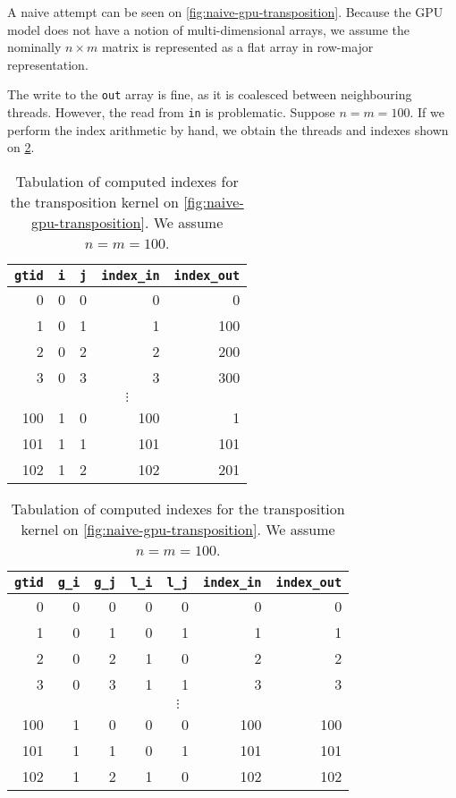 A naive attempt can be seen on \cref{fig:naive-gpu-transposition}.
Because the GPU model does not have a notion of multi-dimensional
arrays, we assume the nominally $n\times{}m$ matrix is represented as
a flat array in row-major representation.

The write to the \texttt{out} array is fine, as it is coalesced
between neighbouring threads.  However, the read from \texttt{in} is
problematic.  Suppose $n=m=100$.  If we perform the index arithmetic
by hand, we obtain the threads and indexes shown on
\cref{tab:naive-gpu-indices}.

\begin{table}

  \begin{subtable}{\textwidth}
  \centering
\begin{tabular}{r|rr|rr}
  \texttt{gtid} & \texttt{i} & \texttt{j} & \texttt{index\_in} & \texttt{index\_out} \\\hline
  0 & 0 & 0 & 0 & 0 \\
  1 & 0 & 1 & 1 & 100 \\
  2 & 0 & 2 & 2 & 200 \\
  3 & 0 & 3 & 3 & 300 \\
  \multicolumn{5}{c}{$\vdots$} \\
  100 & 1 & 0 & 100 & 1 \\
  101 & 1 & 1 & 101 & 101 \\
  102 & 1 & 2 & 102 & 201 \\
\end{tabular}

  \caption{Tabulation of computed indexes for the transposition kernel on \cref{fig:naive-gpu-transposition}.  We assume $n=m=100$.}
  \label{tab:naive-gpu-indices}
  \end{subtable}

  \begin{subtable}{\textwidth}
  \centering
\begin{tabular}{r|rr|rr|rr}
  \texttt{gtid} & \texttt{g\_i} & \texttt{g\_j} & \texttt{l\_i} & \texttt{l\_j} & \texttt{index\_in} & \texttt{index\_out} \\\hline
  0 & 0 & 0 & 0 & 0 &  0 & 0 \\
  1 & 0 & 1 & 0 & 1 &  1 & 1 \\
  2 & 0 & 2 & 1 & 0 &  2 & 2 \\
  3 & 0 & 3 & 1 & 1 &  3 & 3 \\
  \multicolumn{7}{c}{$\vdots$} \\
  100 & 1 & 0 & 0 & 0 & 100 & 100 \\
  101 & 1 & 1 & 0 & 1 & 101 & 101 \\
  102 & 1 & 2 & 1 & 0 & 102 & 102 \\
\end{tabular}


\end{subtable}
\end{table}
